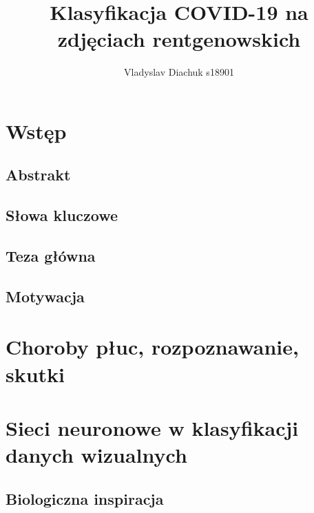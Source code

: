 \documentclass{article}
\title{Klasyfikacja COVID-19 na zdjęciach rentgenowskich}
\author{Vladyslav Diachuk s18901}
\begin{document}
\maketitle

\section{Wstęp}

\subsection{Abstrakt}


\subsection{Słowa kluczowe}


\subsection{Teza główna}

\subsection{Motywacja}


\section{Choroby płuc, rozpoznawanie, skutki}


\section{Sieci neuronowe w klasyfikacji danych wizualnych}

\subsection{Biologiczna inspiracja}
\end{document}
